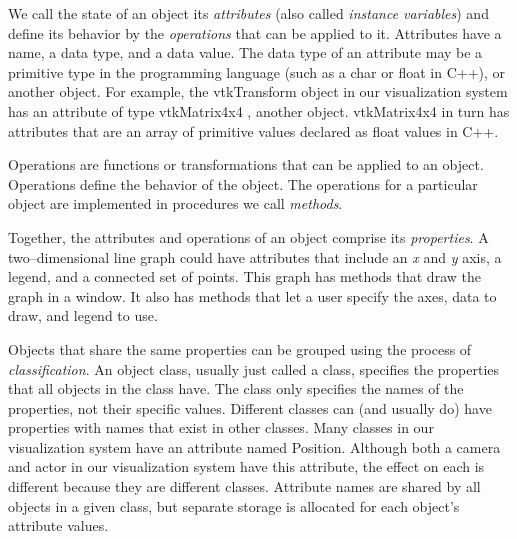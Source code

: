 We call the state of an object its \emph{attributes} (also called \emph{instance variables}) and define its behavior by the \emph{operations} that can be applied to it. Attributes have a name, a data type, and a data value. The data type of an attribute may be a primitive type in the programming language (such as a char or float in C++), or another object. For example, the vtkTransform object in our visualization system has an attribute of type vtkMatrix4x4 , another object. vtkMatrix4x4 in turn has attributes that are an array of primitive values declared as float values in C++.

Operations are functions or transformations that can be applied to an object. Operations define the behavior of the object. The operations for a particular object are implemented in procedures we call \emph{methods}.

Together, the attributes and operations of an object comprise its \emph{properties}. A two--dimensional line graph could have attributes that include an \emph{x} and \emph{y} axis, a legend, and a connected set of points. This graph has methods that draw the graph in a window. It also has methods that let a user specify the axes, data to draw, and legend to use.

Objects that share the same properties can be grouped using the process of \emph{classification}. An object class, usually just called a class, specifies the properties that all objects in the class have. The class only specifies the names of the properties, not their specific values. Different classes can (and usually do) have properties with names that exist in other classes. Many classes in our visualization system have an attribute named Position. Although both a camera and actor in our visualization system have this attribute, the effect on each is different because they are different classes. Attribute names are shared by all objects in a given class, but separate storage is allocated for each object's attribute values.

